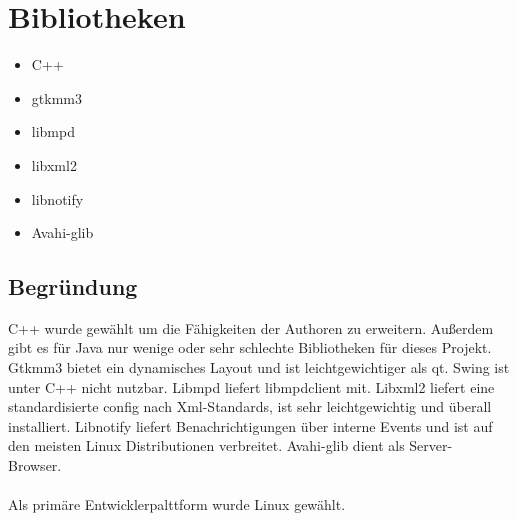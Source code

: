 \section{Bibliotheken}
\begin{itemize}
	\item C++
	\item gtkmm3
	\item libmpd
	\item libxml2
	\item libnotify
	\item Avahi-glib
\end{itemize}
\subsection{Begründung}
C++ wurde gewählt um die Fähigkeiten der Authoren zu erweitern. Außerdem gibt es für Java nur wenige
oder sehr schlechte Bibliotheken für dieses Projekt. Gtkmm3 bietet ein dynamisches Layout und ist 
leichtgewichtiger als qt. Swing ist unter C++ nicht nutzbar. Libmpd liefert libmpdclient mit.
Libxml2 liefert eine standardisierte config nach Xml-Standards, ist sehr leichtgewichtig und überall
installiert. Libnotify liefert Benachrichtigungen über interne Events und ist auf den meisten Linux
Distributionen verbreitet. Avahi-glib dient als Server-Browser.\ \\ \\
Als primäre Entwicklerpalttform wurde Linux gewählt.
